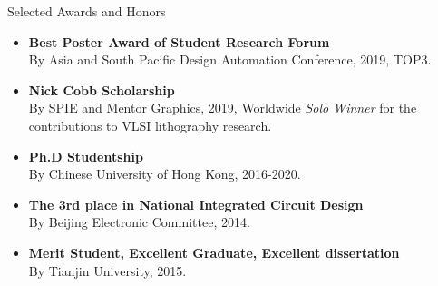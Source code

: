
\begin{rSection}{Selected Awards and Honors}
\iffalse
\begin{tabbing}
\hspace{3.3in}\= \hspace{2.1in}\= \kill
	Best Poster Award of SRF (JPY20000 TOP#3)  \>ASPDAC \>2019 \\
	Nick Cobb Scholarship (USD10,000 Solo Winner)       \>SPIE \& Mentor Graphics   \>2019 \\
    Ph.D Studentship       \>Chinese Univ. of Hong Kong   \>2016-2020  \\
    Merit Student                             \> Qiushi Honors Collage                      \> 2012 \\
    Excellent praise in Mathematical Modeling Contest                            \> Tianjin Univ.                     \> 2012 \\
    The 3rd praise in National Integrated Circuit Design                 \>Beijing Electronic Committee                        \> 2014 \\
    Excellent Graduate                  \> Tianjin Univ.                   \> 2015 \\
    Excellent dissertation                 \> Tianjin Univ.                   \> 2015 \\
 \end{tabbing}
\fi
\begin{itemize}
	\item \textbf{Best Poster Award of Student Research Forum}\\
	By Asia and South Pacific Design Automation Conference, 2019, TOP3.
	\item \textbf{Nick Cobb Scholarship} \\
	By SPIE and Mentor Graphics, 2019, Worldwide \textit{Solo Winner} for the contributions to VLSI lithography research.
	\item \textbf{Ph.D Studentship} \\
	By Chinese University of Hong Kong, 2016-2020.
	\item \textbf{The 3rd place in National Integrated Circuit Design} \\
	By Beijing Electronic Committee, 2014.
	\item \textbf{Merit Student, Excellent Graduate, Excellent dissertation}\\
	By Tianjin University, 2015.
\end{itemize}

\end{rSection}

